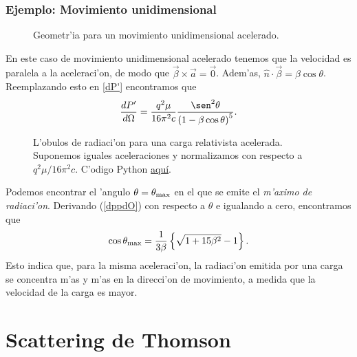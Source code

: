\subsubsection{Ejemplo: Movimiento unidimensional}
\begin{figure}[!h]
\centerline{}
\caption{Geometr'ia para un movimiento unidimensional acelerado.}
\label{R14}
\end{figure}
En este caso de movimiento unidimensional acelerado tenemos que la velocidad es paralela a la aceleraci'on, de modo que $\vec{\beta}\times\vec{a}=\vec{0}$. Adem'as,
$\hat{n}\cdot\vec{\beta}=\beta\cos\theta$.
Reemplazando esto en \eqref{dP'} encontramos que 
\begin{equation}
\frac{dP'}{d\Omega}=\frac{q^2\mu}{16\pi^2 c}\frac{\sen^2
\theta}{\left(1-\beta\cos\theta\right)^5}. \label{dppdO}
\end{equation}
\begin{figure}[H]
\centerline{}
\caption{L'obulos de radiaci'on para una carga relativista acelerada. Suponemos
iguales aceleraciones y normalizamos con respecto a ${q^2\mu}/{16\pi^2 c}$. C'odigo Python \href{https://github.com/gfrubi/electrodinamica/blob/master/figuras-editables/fig-carga-relativista.py}{aqu\'i}.}
\label{lobulo02}
\end{figure}
Podemos encontrar el 'angulo $\theta=\theta_{\rm max}$ en el que se emite el
\textit{m'aximo de radiaci'on}. Derivando (\ref{dppdO}) con respecto a $\theta$ e
igualando a cero, encontramos que
\begin{equation}
\cos\theta_{\rm max}=\frac{1}{3\beta}\left\{  \sqrt{1+15\beta^2}-1\right\}  .
\end{equation}
Esto indica que, para la misma aceleraci'on, la radiaci'on emitida por una carga se concentra m'as y m'as en la direcci'on de movimiento, a medida que la velocidad de la carga es mayor.


\section{Scattering de Thomson}


